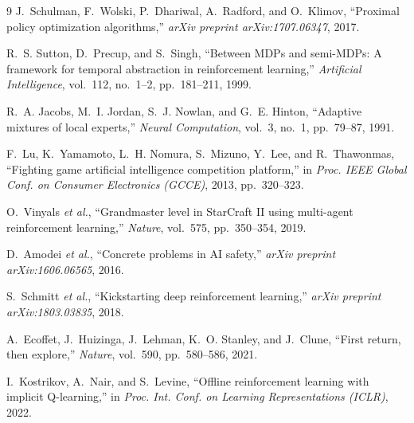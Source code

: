\documentclass[10pt,twocolumn]{article}
\begin{document}
\begin{thebibliography}{9}
J.~Schulman, F.~Wolski, P.~Dhariwal, A.~Radford, and O.~Klimov, ``Proximal policy optimization algorithms,'' \textit{arXiv preprint arXiv:1707.06347}, 2017.

R.~S. Sutton, D.~Precup, and S.~Singh, ``Between MDPs and semi-MDPs: A framework for temporal abstraction in reinforcement learning,'' \textit{Artificial Intelligence}, vol.~112, no.~1--2, pp.~181--211, 1999.

R.~A. Jacobs, M.~I. Jordan, S.~J. Nowlan, and G.~E. Hinton, ``Adaptive mixtures of local experts,'' \textit{Neural Computation}, vol.~3, no.~1, pp.~79--87, 1991.

F.~Lu, K.~Yamamoto, L.~H. Nomura, S.~Mizuno, Y.~Lee, and R.~Thawonmas, ``Fighting game artificial intelligence competition platform,'' in \textit{Proc. IEEE Global Conf. on Consumer Electronics (GCCE)}, 2013, pp.~320--323.

O.~Vinyals \textit{et al.}, ``Grandmaster level in StarCraft II using multi-agent reinforcement learning,'' \textit{Nature}, vol.~575, pp.~350--354, 2019.

D.~Amodei \textit{et al.}, ``Concrete problems in AI safety,'' \textit{arXiv preprint arXiv:1606.06565}, 2016.

S.~Schmitt \textit{et al.}, ``Kickstarting deep reinforcement learning,'' \textit{arXiv preprint arXiv:1803.03835}, 2018.

A.~Ecoffet, J.~Huizinga, J.~Lehman, K.~O. Stanley, and J.~Clune, ``First return, then explore,'' \textit{Nature}, vol.~590, pp.~580--586, 2021.

I.~Kostrikov, A.~Nair, and S.~Levine, ``Offline reinforcement learning with implicit Q-learning,'' in \textit{Proc. Int. Conf. on Learning Representations (ICLR)}, 2022.
\end{thebibliography}
\end{document}

